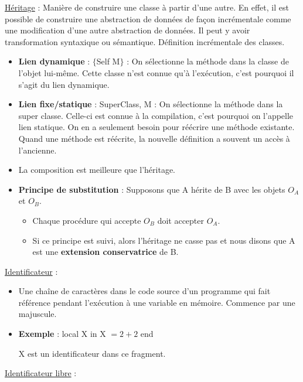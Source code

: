 \documentclass[fr,license=none]{../../../eplsummary}
\begin{document}
\begin{flushleft}
\textcolor{mauvedef}{\underline{Héritage}} : Manière de construire une classe à partir d’une autre.  En effet, il est possible de construire une abstraction de données de façon incrémentale comme une modification d’une autre abstraction de données. Il peut y avoir transformation syntaxique ou sémantique. Définition incrémentale des classes.

\begin{itemize}
\item \textbf{Lien dynamique} : \textcolor{miorangerouge}{$\{$Self M$\}$} : On sélectionne la méthode dans la classe de l’objet lui-même. Cette classe n’est connue qu’à l’exécution, c’est pourquoi il s’agit du lien dynamique.
\item \textbf{Lien fixe/statique} : \textcolor{miorangerouge}{SuperClass, M} : On sélectionne la méthode dans la super classe. Celle-ci est connue à la compilation, c’est pourquoi on l’appelle lien statique. On en a seulement besoin pour réécrire une méthode existante. Quand une méthode est réécrite, la nouvelle définition a souvent un accès à l'ancienne.
\item La composition est meilleure que l'héritage.
\item \textbf{Principe de substitution} : Supposons que A hérite de B avec les objets $O_A$ et $O_B$.
\begin{itemize}[label=\circ]
\item Chaque procédure qui accepte $O_B$ doit accepter $O_A$.
\item Si ce principe est suivi, alors l'héritage ne casse pas et nous disons que A est une \textbf{extension conservatrice} de B.
\end{itemize}
\end{itemize} \bigbreak



\textcolor{mauvedef}{\underline{Identificateur}} : 

\begin{itemize}
\item Une chaîne de caractères dans le code source d’un programme qui fait référence pendant l’exécution à une variable en mémoire. Commence par une majuscule.
\item \textbf{Exemple} : local X in X $=2+2$ end 

X est un identificateur dans ce fragment.
\end{itemize} \bigbreak


\textcolor{mauvedef}{\underline{Identificateur libre}} :


\end{flushleft}
\end{document}
